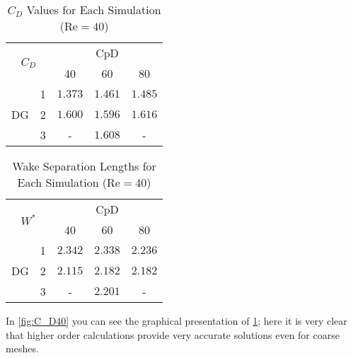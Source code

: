 \begin{table}[htp]
	\centering
	\def\arraystretch{1.5}
		\begin{tabular}{|c|c|c|c|c|}
			\hline
			\multicolumn{2}{|c|}{\multirow{2}{*}{$C_D$}} & \multicolumn{3}{c|}{CpD} \\ \cline{3-5} 
			\multicolumn{2}{|c|}{}                       & 40     & 60    & 80    \\ \hline
			\multirow{3}{*}{DG}            & 1           &   $1.373$     &     $1.461$  &     $1.485$   \\ \cline{2-5} 
			& 2           &     $1.600$   &   $1.596$    &     $1.616$   \\ \cline{2-5} 
			& 3           &      -  &     $1.608$  &     -   \\ \hline
		\end{tabular}
		\caption[$C_D$ Values for each simulation]{$C_D$ Values for Each Simulation ($\text{Re} = 40$)}	
		\label{C_D40}
	\end{table}
	\begin{table}[htp]
	\centering
	\def\arraystretch{1.5}
		\begin{tabular}{|c|c|c|c|c|}
			\hline
			\multicolumn{2}{|c|}{\multirow{2}{*}{$W^*$}} & \multicolumn{3}{c|}{CpD} \\ \cline{3-5} 
			\multicolumn{2}{|c|}{}                       & 40     & 60    & 80    \\ \hline
			\multirow{3}{*}{DG}            & 1           &    $2.342$    &    $2.338$   &    $2.236$    \\ \cline{2-5} 
			& 2           &     $2.115$   &    $2.182$   &     $2.182$   \\ \cline{2-5} 
			& 3           &     -   &    $2.201$   &    -    \\ \hline
		\end{tabular}
		\caption{Wake Separation Lengths for Each Simulation ($\text{Re} = 40$)}	
		\label{W40}
\end{table}
\newpage
In \cref{fig:C_D40} you can see the graphical presentation of \cref{C_D40}; here it is very clear that higher order calculations provide very accurate solutions even for coarse meshes. \\\indent
